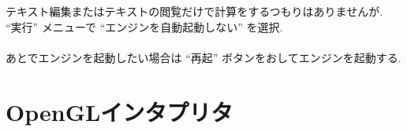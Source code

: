 \documentclass{jbook}
\begin{document}
\noindent
{}
 テキスト編集またはテキストの閲覧だけで計算をするつもりはありませんが. \\
   ``実行'' メニューで ``エンジンを自動起動しない'' を選択. \\
 \\
あとでエンジンを起動したい場合は  ``再起'' ボタンをおしてエンジンを起動する. \\


\section{OpenGLインタプリタ}
\end{document}

